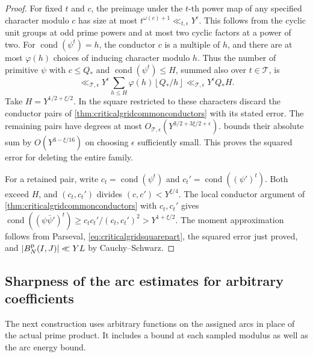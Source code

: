 \documentclass[11pt,a4paper]{article}
\numberwithin{equation}{section}
\begin{document}
\begin{proof}
For fixed $t$ and $c$, the preimage under the $t$-th power map
of any specified character modulo $c$ has size at most
$t^{\omega(c)+1}\ll_{t,\epsilon}Y^\epsilon$.
This follows from the cyclic unit groups at odd prime powers
and at most two cyclic factors at a power of two.
For $\operatorname{cond}(\psi^t)=h$, the conductor $c$ is a
multiple of $h$, and there are at most $\varphi(h)$ choices
of inducing character modulo $h$. Thus the number of
primitive $\psi$ with $c\le Q_*$ and
$\operatorname{cond}(\psi^t)\le H$, summed also over
$t\in\mathcal T$, is
\[
 \ll_{\mathcal T,\epsilon}
    Y^\epsilon\sum_{h\le H}\varphi(h)\left\lfloor Q_*/h\right\rfloor
 \ll_{\mathcal T,\epsilon}Y^\epsilon Q_*H.
\]
Take $H=Y^{1/2+\xi/2}$. In the square restricted to these
characters discard the conductor pairs of
\cref{thm:criticalgridcommonconductors} with its stated error.
The remaining pairs have degrees at most
$O_{\mathcal T,\epsilon}(Y^{3/2+3\xi/2+\epsilon})$.
 bounds their absolute
sum by $O(Y^{3-\xi/16})$ on choosing $\epsilon$ sufficiently
small. This proves the squared error for deleting the entire
family.

For a retained pair, write $c_t=\operatorname{cond}(\psi^t)$
and $c_t'=\operatorname{cond}((\psi')^t)$. Both exceed $H$,
and $(c_t,c_t')$ divides $(c,c')<Y^{\xi/4}$.
The local conductor argument of
\cref{thm:criticalgridcommonconductors} with $c_t,c_t'$
gives
$\operatorname{cond}((\psi\bar\psi')^t)
 \ge c_t c_t'/(c_t,c_t')^2>Y^{1+\xi/2}$.
The moment approximation follows from Parseval,
\cref{eq:criticalgridsquarepart}, the squared error just proved,
and $|B_N^{\rm p}(I,J)|\ll YL$ by Cauchy--Schwarz.
\end{proof}

\clearpage
\subsection{Sharpness of the arc estimates for arbitrary coefficients}

The next construction uses arbitrary functions on the assigned
arcs in place of the actual prime product. It includes a bound
at each sampled modulus as well as the arc energy bound.
\end{document}
